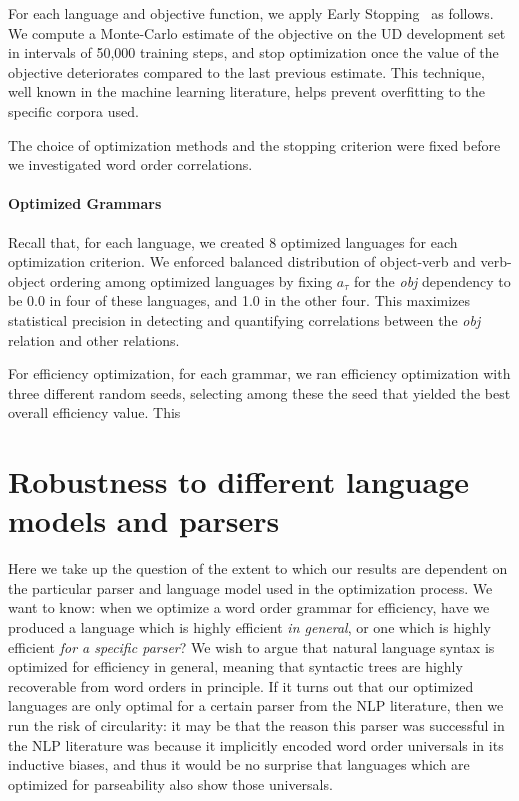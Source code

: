 \documentclass[10pt,twoside,lineno]{article}
\begin{document}
For each language and objective function, we apply Early Stopping~\citep{prechelt1998early} as follows. We compute a Monte-Carlo estimate of the objective on the UD development set in intervals of 50,000 training steps, and stop optimization once the value of the objective deteriorates compared to the last previous estimate. This technique, well known in the machine learning literature, helps prevent overfitting to the specific corpora used.

The choice of optimization methods and the stopping criterion were fixed before we investigated word order correlations.

\paragraph{Optimized Grammars}

Recall that, for each language, we created 8 optimized languages for each optimization criterion.
We enforced balanced distribution of object-verb and verb-object ordering among optimized languages by fixing $a_\tau$ for the \textit{obj} dependency to be 0.0 in four of these languages, and 1.0 in the other four.
This maximizes statistical precision in detecting and quantifying correlations between the \textit{obj} relation and other relations.

For efficiency optimization, for each grammar, we ran efficiency optimization with three different random seeds, selecting among these the seed that yielded the best overall efficiency value.
This 





\section{Robustness to different language models and parsers}


Here we take up the question of the extent to which our results are dependent on the particular parser and language model used in the optimization process. We want to know: when we optimize a word order grammar for efficiency, have we produced a language which is highly efficient \emph{in general}, or one which is highly efficient \emph{for a specific parser}? We wish to argue that natural language syntax is optimized for efficiency in general, meaning that syntactic trees are highly recoverable from word orders in principle. If it turns out that our optimized languages are only optimal for a certain parser from the NLP literature, then we run the risk of circularity: it may be that the reason this parser was successful in the NLP literature was because it implicitly encoded word order universals in its inductive biases, and thus it would be no surprise that languages which are optimized for parseability also show those universals.
\end{document}
